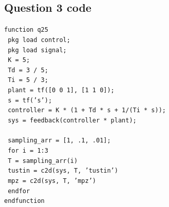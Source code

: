 \documentclass[a4paper, 12pt]{article}
\begin{document}
\begin{appendices}
  \section{Question 3 code}
  \label{sec:appendix_3}
  \texttt{function q25}\\\noindent
  \texttt{\hspace*{1em}  pkg load control;}\\\noindent
  \texttt{\hspace*{1em}  pkg load signal;}\\\noindent
  \texttt{\hspace*{1em}  K =  5;}\\\noindent
  \texttt{\hspace*{1em}  Td =  3 / 5;}\\\noindent
  \texttt{\hspace*{1em}  Ti =  5 / 3;}\\\noindent
  \texttt{\hspace*{1em}  plant = tf([0 0 1], [1 1 0]);}\\\noindent
  \texttt{\hspace*{1em}  s = tf('s');}\\\noindent
  \texttt{\hspace*{1em}  controller = K * (1 + Td * s + 1/(Ti * s));}\\\noindent
  \texttt{\hspace*{1em}  sys = feedback(controller * plant);}\\\noindent
  \texttt{\hspace*{1em}  }\\\noindent
  \texttt{\hspace*{1em}  sampling\_arr = [1, .1, .01];}\\\noindent
  \texttt{\hspace*{1em}  for i = 1:3}\\\noindent
  \texttt{\hspace*{2em}    T = sampling\_arr(i)}\\\noindent
  \texttt{\hspace*{2em}    tustin = c2d(sys, T, 'tustin')}\\\noindent
  \texttt{\hspace*{2em}    mpz = c2d(sys, T, 'mpz')}\\\noindent
  \texttt{\hspace*{1em}  endfor}\\\noindent
  \texttt{endfunction}
\end{appendices}
\end{document}

